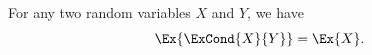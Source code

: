 \begin{lemma}%
    For any two random variables $X$ and $Y$, we have
    \begin{equation*}
        \Ex{ \bigl. \ExCond{X}{ Y} } = \Ex{ \bigl. X}.
    \end{equation*}
\end{lemma}
